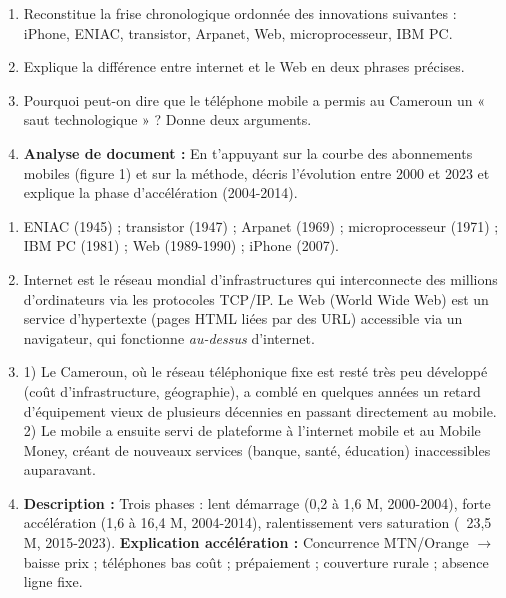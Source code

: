 \documentclass[11pt]{article}
\begin{document}
\begin{exercice}
\begin{enumerate}
\item Reconstitue la frise chronologique ordonnée des innovations suivantes : iPhone, ENIAC, transistor, Arpanet, Web, microprocesseur, IBM PC.
\item Explique la différence entre internet et le Web en deux phrases précises.
\item Pourquoi peut-on dire que le téléphone mobile a permis au Cameroun un « saut technologique » ? Donne deux arguments.
\item \textbf{Analyse de document :} En t'appuyant sur la courbe des abonnements mobiles (figure 1) et sur la méthode, décris l'évolution entre 2000 et 2023 et explique la phase d'accélération (2004-2014).
\end{enumerate}
\end{exercice}

\begin{corrige}[Exercice]
\begin{enumerate}
\item ENIAC (1945) ; transistor (1947) ; Arpanet (1969) ; microprocesseur (1971) ; IBM PC (1981) ; Web (1989-1990) ; iPhone (2007).
\item Internet est le réseau mondial d'infrastructures qui interconnecte des millions d'ordinateurs via les protocoles TCP/IP. Le Web (World Wide Web) est un service d'hypertexte (pages HTML liées par des URL) accessible via un navigateur, qui fonctionne \emph{au-dessus} d'internet.
\item 1) Le Cameroun, où le réseau téléphonique fixe est resté très peu développé (coût d'infrastructure, géographie), a comblé en quelques années un retard d'équipement vieux de plusieurs décennies en passant directement au mobile. 2) Le mobile a ensuite servi de plateforme à l'internet mobile et au Mobile Money, créant de nouveaux services (banque, santé, éducation) inaccessibles auparavant.
\item \textbf{Description :} Trois phases : lent démarrage (0,2 à 1,6 M, 2000-2004), forte accélération (1,6 à 16,4 M, 2004-2014), ralentissement vers saturation (~23,5 M, 2015-2023). \textbf{Explication accélération :} Concurrence MTN/Orange $\rightarrow$ baisse prix ; téléphones bas coût ; prépaiement ; couverture rurale ; absence ligne fixe.
\end{enumerate}
\end{corrige}
\end{document}
